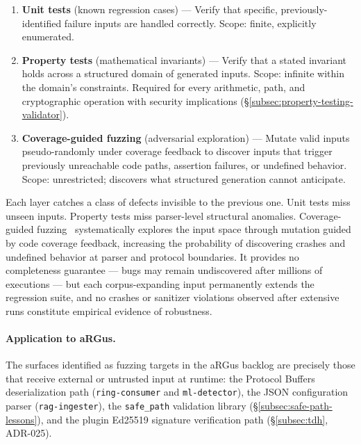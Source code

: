 \documentclass[11pt,a4paper]{article}
\begin{document}
    \begin{enumerate}
        \item \textbf{Unit tests} (known regression cases) ---
        Verify that specific, previously-identified failure inputs are handled
        correctly. Scope: finite, explicitly enumerated.

        \item \textbf{Property tests} (mathematical invariants) ---
        Verify that a stated invariant holds across a structured domain of
        generated inputs. Scope: infinite within the domain's constraints.
        Required for every arithmetic, path, and cryptographic operation with
        security implications (\S\ref{subsec:property-testing-validator}).

        \item \textbf{Coverage-guided fuzzing} (adversarial exploration) ---
        Mutate valid inputs pseudo-randomly under coverage feedback to discover
        inputs that trigger previously unreachable code paths, assertion failures,
        or undefined behavior. Scope: unrestricted; discovers what structured
        generation cannot anticipate.
    \end{enumerate}

    Each layer catches a class of defects invisible to the previous one.
    Unit tests miss unseen inputs. Property tests miss parser-level structural
    anomalies. Coverage-guided fuzzing~\cite{libfuzzer2016} systematically
    explores the input space through mutation guided by code coverage feedback,
    increasing the probability of discovering crashes and undefined behavior at
    parser and protocol boundaries. It provides no completeness guarantee ---
    bugs may remain undiscovered after millions of executions --- but each
    corpus-expanding input permanently extends the regression suite, and no
    crashes or sanitizer violations observed after extensive runs constitute
    empirical evidence of robustness.

    \paragraph{Application to aRGus.}
    The surfaces identified as fuzzing targets in the aRGus backlog are precisely
    those that receive external or untrusted input at runtime: the Protocol Buffers
    deserialization path (\texttt{ring-consumer} and \texttt{ml-detector}), the
    JSON configuration parser (\texttt{rag-ingester}), the \texttt{safe\_path}
    validation library (\S\ref{subsec:safe-path-lessons}), and the plugin
    Ed25519 signature verification path (\S\ref{subsec:tdh}, ADR-025).
\end{document}
